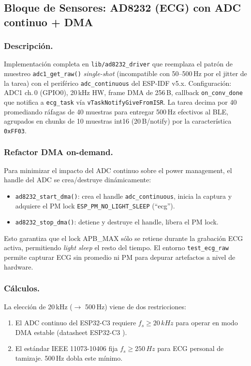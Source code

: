 \documentclass[letterpaper,11pt]{article}
\begin{document}
\subsection{Bloque de Sensores: AD8232 (ECG) con ADC continuo + DMA}
\subsubsection{Descripción.} Implementación completa en \texttt{lib/ad8232\_driver} que reemplaza
el patrón de muestreo \texttt{adc1\_get\_raw()} \textit{single-shot} (incompatible con
50--500\,Hz por el jitter de la tarea) con el periférico \texttt{adc\_continuous} del
ESP-IDF v5.x. Configuración: ADC1 ch.\,0 (GPIO0), 20\,kHz HW, frame DMA de 256\,B, callback
\texttt{on\_conv\_done} que notifica a \texttt{ecg\_task} vía
\texttt{vTaskNotifyGiveFromISR}. La tarea decima por 40 promediando ráfagas de 40 muestras
para entregar 500\,Hz efectivos al BLE, agrupados en chunks de 10 muestras int16
(20\,B/notify) por la característica \texttt{0xFF03}.

\subsubsection{Refactor DMA on-demand.} Para minimizar el impacto del ADC continuo sobre el
power management, el handle del ADC se crea/destruye dinámicamente:
\begin{itemize}
    \item \texttt{ad8232\_start\_dma()}: crea el handle \texttt{adc\_continuous}, inicia la
    captura y adquiere el PM lock \texttt{ESP\_PM\_NO\_LIGHT\_SLEEP} (``ecg'').
    \item \texttt{ad8232\_stop\_dma()}: detiene y destruye el handle, libera el PM lock.
\end{itemize}
Esto garantiza que el lock APB\_MAX sólo se retiene durante la grabación ECG activa,
permitiendo \textit{light sleep} el resto del tiempo. El entorno \texttt{test\_ecg\_raw}
permite capturar ECG sin promedio ni PM para depurar artefactos a nivel de hardware.

\subsubsection{Cálculos.} La elección de 20\,kHz ($\to$ 500\,Hz) viene de dos restricciones:
\begin{enumerate}
    \item El ADC continuo del ESP32-C3 requiere $f_s \geq 20\,kHz$ para operar en modo DMA
    estable (datasheet ESP32-C3 \cite{esp32c3_ds}).
    \item El estándar IEEE 11073-10406 \cite{ieee11073} fija $f_s \geq 250\,Hz$ para ECG
    personal de tamizaje. 500\,Hz dobla este mínimo.
\end{enumerate}
\end{document}

